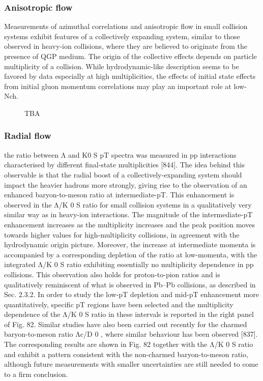 \subsubsection{Anisotropic flow}

Measurements of azimuthal correlations and anisotropic flow in small collision systems exhibit features of a collectively expanding system, similar to those observed in heavy-ion
collisions, where they are believed to originate from the presence of QGP medium. The origin of the
collective effects depends on particle multiplicity of a collision. While hydrodynamic-like description
seems to be favored by data especially at high multiplicities, the effects of initial state effects from initial
gluon momentum correlations may play an important role at low-Nch.

\begin{figure}[H]
\caption{TBA}
\label{fig:colls:ssv2}
\end{figure}

\subsubsection{Radial flow}

the ratio between Λ and K0
S
pT spectra was measured in pp interactions
characterised by different final-state multiplicities [844]. The idea behind this observable is that the radial boost of a collectively-expanding system should impact the heavier hadrons more strongly, giving
rise to the observation of an enhanced baryon-to-meson ratio at intermediate-pT. This enhancement is
observed in the Λ/K
0
S
ratio for small collision systems in a qualitatively very similar way as in heavy-ion
interactions. The magnitude of the intermediate-pT enhancement increases as the multiplicity increases
and the peak position moves towards higher values for high-multiplicity collisions, in agreement with the
hydrodynamic origin picture. Moreover, the increase at intermediate momenta is accompanied by a corresponding depletion of the ratio at low-momenta, with the integrated Λ/K
0
S
ratio exhibiting essentially
no multiplicity dependence in pp collisions. This observation also holds for proton-to-pion ratios and is
qualitatively reminiscent of what is observed in Pb–Pb collisions, as described in Sec. 2.3.2. In order to
study the low-pT depletion and mid-pT enhancement more quantitatively, specific pT regions have been
selected and the multiplicity dependence of the Λ/K
0
S
ratio in these intervals is reported in the right panel
of Fig. 82.
Similar studies have also been carried out recently for the charmed baryon-to-meson ratio Λc/D
0
, where
similar behaviour has been observed [837]. The corresponding results are shown in Fig. 82 together with
the Λ/K
0
S
ratio and exhibit a pattern consistent with the non-charmed baryon-to-meson ratio, although
future measurements with smaller uncertainties are still needed to come to a firm conclusion.

